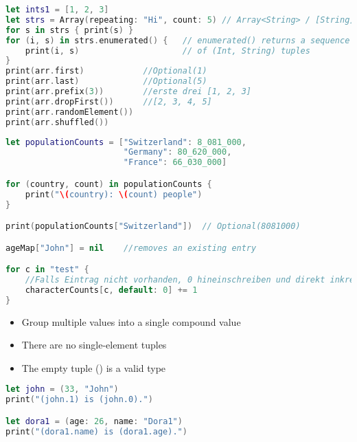 \begin{breakbox}

\begin{lstlisting}[language=swift]
let ints1 = [1, 2, 3]
let strs = Array(repeating: "Hi", count: 5) // Array<String> / [String]
for s in strs { print(s) }
for (i, s) in strs.enumerated() {   // enumerated() returns a sequence
    print(i, s)                     // of (Int, String) tuples
}
print(arr.first)            //Optional(1)
print(arr.last)             //Optional(5)
print(arr.prefix(3))        //erste drei [1, 2, 3]
print(arr.dropFirst())      //[2, 3, 4, 5]
print(arr.randomElement())
print(arr.shuffled())
\end{lstlisting}
\end{breakbox}

\begin{breakbox}

\begin{lstlisting}[language=swift]
let populationCounts = ["Switzerland": 8_081_000,
                        "Germany": 80_620_000,
                        "France": 66_030_000]

for (country, count) in populationCounts {
    print("\(country): \(count) people")
}

print(populationCounts["Switzerland"])  // Optional(8081000)

ageMap["John"] = nil    //removes an existing entry

for c in "test" {
    //Falls Eintrag nicht vorhanden, 0 hineinschreiben und direkt inkrementieren. Keine Ueberpruefung
    characterCounts[c, default: 0] += 1
}
\end{lstlisting}
\end{breakbox}

\begin{breakbox}

\begin{itemize}
\tightlist
\item
  Group multiple values into a single compound value
\item
  There are no single-element tuples
\item
  The empty tuple () is a valid type
\end{itemize}

\begin{lstlisting}[language=swift]
let john = (33, "John")
print("(john.1) is (john.0).")

let dora1 = (age: 26, name: "Dora1")
print("(dora1.name) is (dora1.age).")
\end{lstlisting}
\end{breakbox}

